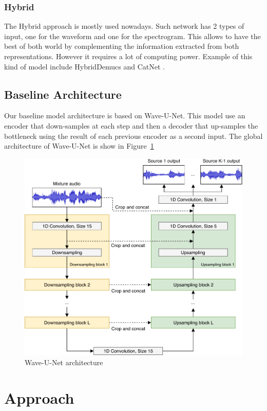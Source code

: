 \documentclass[final]{cvpr}
\begin{document}
\subsubsection{Hybrid}
The Hybrid approach is mostly used nowadays. Such network has 2 types of input, one for the waveform and one for the spectrogram.  
This allows to have the best of both world by complementing the information extracted from both representations. However it requires a lot of computing power. Example of this kind of model include HybridDemucs \cite{hybrid-demucs} and CatNet \cite{catnet}.

\subsection{Baseline Architecture}

Our baseline model architecture is based on Wave-U-Net. This model use an encoder that down-samples at each step and then a decoder that up-samples the bottleneck using the result of each previous encoder as a second input.
The global architecture of Wave-U-Net\cite{waveunet} is show in Figure~\ref{waveunet-architecture}

\begin{figure}
   \includegraphics[scale=0.25]{waveunet.png}
   \caption{Wave-U-Net architecture}
   \label{waveunet-architecture}
\end{figure}

\section{Approach}
\end{document}

